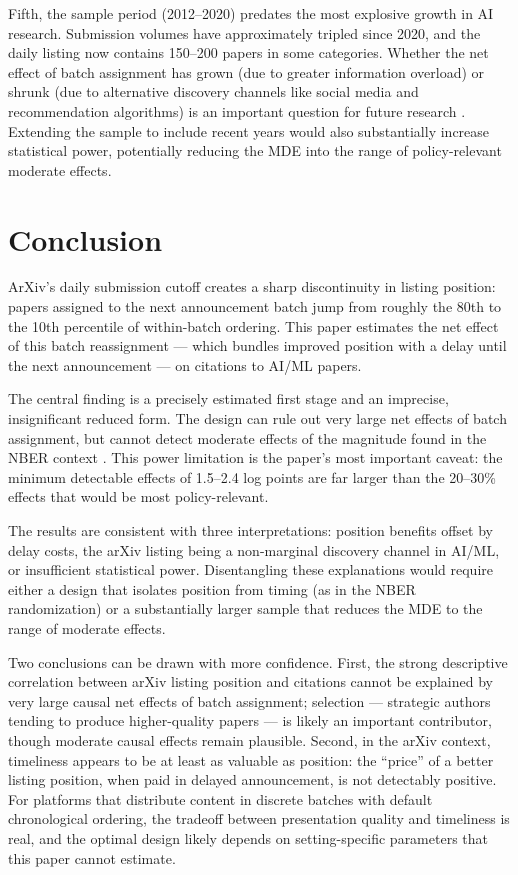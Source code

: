\documentclass[12pt]{article}
\begin{document}
Fifth, the sample period (2012--2020) predates the most explosive growth in AI research. Submission volumes have approximately tripled since 2020, and the daily listing now contains 150--200 papers in some categories. Whether the net effect of batch assignment has grown (due to greater information overload) or shrunk (due to alternative discovery channels like social media and recommendation algorithms) is an important question for future research \citep{urquhart2022}. Extending the sample to include recent years would also substantially increase statistical power, potentially reducing the MDE into the range of policy-relevant moderate effects.


\section{Conclusion}

ArXiv's daily submission cutoff creates a sharp discontinuity in listing position: papers assigned to the next announcement batch jump from roughly the 80th to the 10th percentile of within-batch ordering. This paper estimates the net effect of this batch reassignment --- which bundles improved position with a delay until the next announcement --- on citations to AI/ML papers.

The central finding is a precisely estimated first stage and an imprecise, insignificant reduced form. The design can rule out very large net effects of batch assignment, but cannot detect moderate effects of the magnitude found in the NBER context \citep{feenberg2017}. This power limitation is the paper's most important caveat: the minimum detectable effects of 1.5--2.4 log points are far larger than the 20--30\% effects that would be most policy-relevant.

The results are consistent with three interpretations: position benefits offset by delay costs, the arXiv listing being a non-marginal discovery channel in AI/ML, or insufficient statistical power. Disentangling these explanations would require either a design that isolates position from timing (as in the NBER randomization) or a substantially larger sample that reduces the MDE to the range of moderate effects.

Two conclusions can be drawn with more confidence. First, the strong descriptive correlation between arXiv listing position and citations \citep{haque2009, haque2010, dietrich2008} cannot be explained by very large causal net effects of batch assignment; selection --- strategic authors tending to produce higher-quality papers --- is likely an important contributor, though moderate causal effects remain plausible. Second, in the arXiv context, timeliness appears to be at least as valuable as position: the ``price'' of a better listing position, when paid in delayed announcement, is not detectably positive. For platforms that distribute content in discrete batches with default chronological ordering, the tradeoff between presentation quality and timeliness is real, and the optimal design likely depends on setting-specific parameters that this paper cannot estimate.
\end{document}
